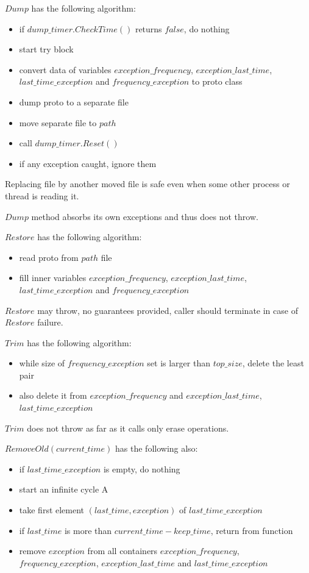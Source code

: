\documentclass{article}
\begin{document}
$Dump$ has the following algorithm:
\begin{itemize}
	\item if $dump\_timer.CheckTime()$ returns $false$, do nothing
	\item start try block
	\item convert data of variables $exception\_frequency$, $exception\_last\_time$, $last\_time\_exception$ and $frequency\_exception$ to proto class
	\item dump proto to a separate file
	\item move separate file to $path$
	\item call $dump\_timer.Reset()$
	\item if any exception caught, ignore them
\end{itemize}

Replacing file by another moved file is safe even when some other process or thread is reading it.

$Dump$ method absorbs its own exceptions and thus does not throw.

$Restore$ has the following algorithm:
\begin{itemize}
	\item read proto from $path$ file
	\item fill inner variables $exception\_frequency$, $exception\_last\_time$, $last\_time\_exception$ and $frequency\_exception$
\end{itemize}

$Restore$ may throw, no guarantees provided, caller should terminate in case of $Restore$ failure.

$Trim$ has the following algorithm:
\begin{itemize}
	\item while size of $frequency\_exception$ set is larger than $top\_size$, delete the least pair
	\item also delete it from $exception\_frequency$ and $exception\_last\_time$, $last\_time\_exception$
\end{itemize}

$Trim$ does not throw as far as it calls only erase operations.

$RemoveOld(current\_time)$ has the following also:
\begin{itemize}
	\item if $last\_time\_exception$ is empty, do nothing
	\item start an infinite cycle A
	\item take first element $(last\_time, exception)$ of $last\_time\_exception$
	\item if $last\_time$ is more than $current\_time - keep\_time$, return from function
	\item remove $exception$ from all containers $exception\_frequency$, \\
		$frequency\_exception$, $exception\_last\_time$ and $last\_time\_exception$
\end{itemize}
\end{document}
